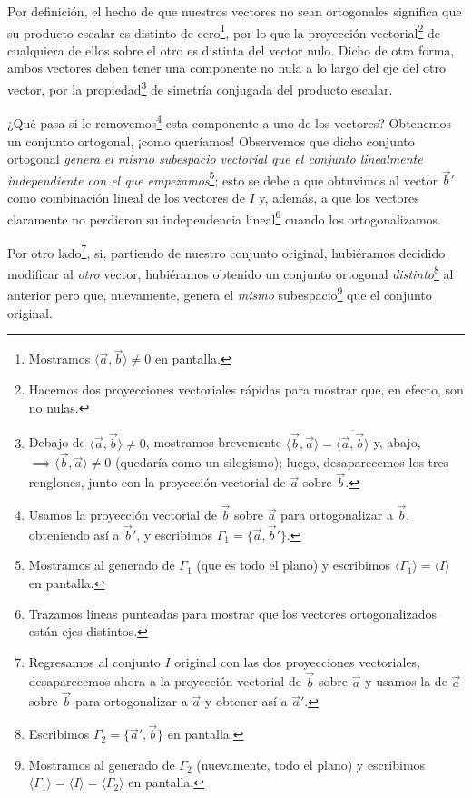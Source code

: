 \documentclass[12pt,dvipsnames]{article}
\numberwithin{equation}{section}
\begin{document}
Por definición, el hecho de que nuestros vectores no sean ortogonales significa que su producto escalar es distinto de cero\footnote{Mostramos $\langle \vec{a},\vec{b}\rangle\neq0$ en pantalla.}, por lo que la proyección vectorial\footnote{Hacemos dos proyecciones vectoriales rápidas para mostrar que, en efecto, son no nulas.} de cualquiera de ellos sobre el otro es distinta del vector nulo. Dicho de otra forma, ambos vectores deben tener una componente no nula a lo largo del eje del otro vector, por la propiedad\footnote{Debajo de $\langle\vec{a},\vec{b}\rangle\neq0$, mostramos brevemente $\langle \vec{b},\vec{a}\rangle = \overline{\langle \vec{a},\vec{b}\rangle}$ y, abajo, $\implies \langle\vec{b},\vec{a}\rangle\neq0$ (quedaría como un silogismo); luego, desaparecemos los tres renglones, junto con la proyección vectorial de $\vec{a}$ sobre $\vec{b}$.} de simetría conjugada del producto escalar.

¿Qué pasa si le removemos\footnote{Usamos la proyección vectorial de $\vec{b}$ sobre $\vec{a}$ para ortogonalizar a $\vec{b}$, obteniendo así a $\vec{b}'$, y escribimos $\Gamma_1=\{\vec{a},\vec{b}'\}$.} esta componente a uno de los vectores? Obtenemos un conjunto ortogonal, ¡como queríamos! Observemos que dicho conjunto ortogonal \emph{genera el mismo subespacio vectorial que el conjunto linealmente independiente con el que empezamos}\footnote{Mostramos al generado de $\Gamma_1$ (que es todo el plano) y escribimos $\langle \Gamma_1 \rangle = \langle I \rangle$ en pantalla.}; esto se debe a que obtuvimos al vector $\vec{b}'$ como combinación lineal de los vectores de $I$ y, además, a que los vectores claramente no perdieron su independencia lineal\footnote{Trazamos líneas punteadas para mostrar que los vectores ortogonalizados están ejes distintos.} cuando los ortogonalizamos.

Por otro lado\footnote{Regresamos al conjunto $I$ original con las dos proyecciones vectoriales, desaparecemos ahora a la proyección vectorial de $\vec{b}$ sobre $\vec{a}$ y usamos la de $\vec{a}$ sobre $\vec{b}$ para ortogonalizar a $\vec{a}$ y obtener así a $\vec{a}'$.}, si, partiendo de nuestro conjunto original, hubiéramos decidido modificar al \emph{otro} vector, hubiéramos obtenido un conjunto ortogonal \emph{distinto}\footnote{Escribimos $\Gamma_2=\{\vec{a}',\vec{b}\}$ en pantalla.} al anterior pero que, nuevamente, genera el \emph{mismo} subespacio\footnote{Mostramos al generado de $\Gamma_2$ (nuevamente, todo el plano) y escribimos $\langle \Gamma_1 \rangle = \langle I \rangle=\langle \Gamma_2 \rangle$ en pantalla.} que el conjunto original.
\end{document}
